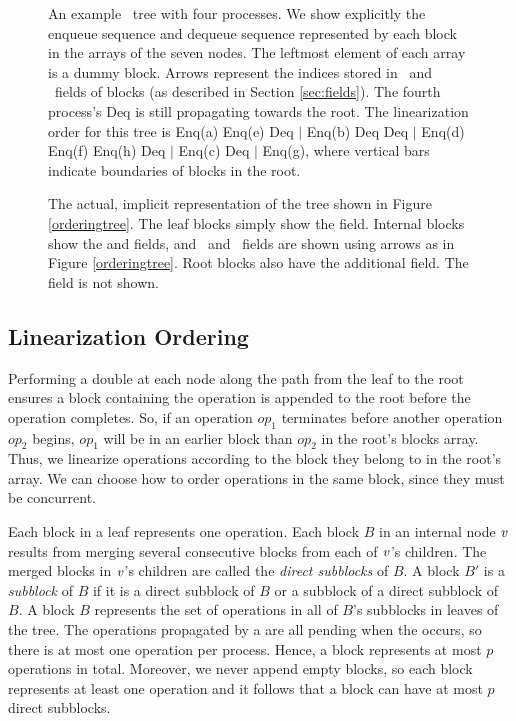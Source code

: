 \begin{figure*}[t]

\caption{An example \ordering\ tree with four processes. 
We show explicitly the enqueue sequence and dequeue sequence represented by each block in the  arrays of the seven nodes.  The leftmost element of each  array is a dummy block.
Arrows represent the indices stored in \eleft\ and \eright\ fields of blocks (as described in Section \ref{sec:fields}).
The fourth process's Deq is still propagating towards the root.
The linearization order for this tree is
Enq(a) Enq(e) Deq $\mid$ Enq(b) Deq Deq $\mid$ Enq(d) Enq(f) Enq(h) Deq $\mid$ Enq(c) Deq $\mid$ Enq(g), where vertical bars indicate boundaries of blocks in the root.\label{orderingtree}}
\medskip

\caption{\label{implicit}The actual, implicit representation of the tree shown in Figure \ref{orderingtree}.
The leaf blocks simply show the  field.
Internal blocks show the  and  fields,
and \eleft\ and \eright\ fields are shown using arrows as in Figure \ref{orderingtree}.
Root blocks also have the additional  field.
The  field is not shown.}
\end{figure*}

\subsection{Linearization Ordering}

Performing a double  at each node along the path from the leaf to the root ensures 
a block containing the operation is appended to the root before the operation completes.
So, if an operation $op_1$ terminates before another operation $op_2$ begins, 
$op_1$ will be in an earlier block than $op_2$ in the root's blocks array.
Thus, we linearize operations according to the block they belong to in the root's array.
We can choose how to order operations in the same block, since they must be concurrent.

Each block in a leaf represents one operation.
Each block $B$ in an internal node $\mbox{\textnormal{\textit{v}}}$ results from merging
several consecutive blocks from each of $\mbox{\textnormal{\textit{v}}}$'s children.
The merged blocks in $\mbox{\textnormal{\textit{v}}}$'s children are called the \emph{direct subblocks} of $B$.
A block $B'$ is a \emph{subblock} of $B$ if it is a direct subblock of $B$
or a subblock of a direct subblock of $B$.
A block $B$ represents the set of operations in all of $B$'s subblocks in leaves of the tree.
The operations propagated by a  are all pending when the  occurs,
so there is at most one operation per process.
Hence, a block represents at most $p$ operations in total.  
Moreover, we never append empty blocks, so 
each block represents at least one operation and it follows that a block can have at most $p$ direct subblocks.

